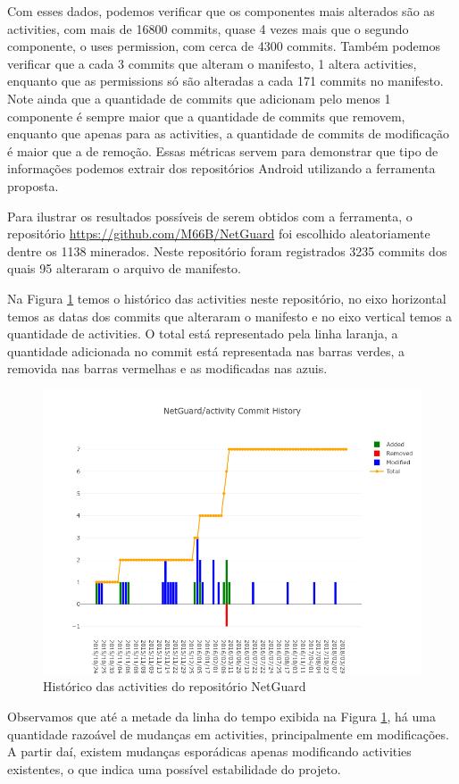 \documentclass[a4paper,12pt]{article}
\begin{document}
{Com esses dados, podemos verificar que os componentes mais alterados são as activities, com mais de 16800 commits, quase 4 vezes mais que o segundo componente, o uses permission, com cerca de 4300 commits. Também podemos verificar que a cada 3 commits que alteram o manifesto, 1 altera activities, enquanto que as permissions só são alteradas a cada 171 commits no manifesto. Note ainda que a quantidade de commits que adicionam pelo menos 1 componente é sempre maior que a quantidade de commits que removem, enquanto que apenas para as activities, a quantidade de commits de modificação é maior que a de remoção. Essas métricas servem para demonstrar que tipo de informações podemos extrair dos repositórios Android utilizando a ferramenta proposta. 

\sloppy
Para ilustrar os resultados possíveis de serem obtidos com a ferramenta, o repositório {\fontsize{10pt}{12pt}\url{https://github.com/M66B/NetGuard}} foi escolhido aleatoriamente dentre os 1138 minerados. Neste repositório foram registrados 3235 commits dos quais 95 alteraram o arquivo de manifesto.

Na Figura \ref{fig:repoactivity} temos o histórico das activities neste repositório, no eixo horizontal temos as datas dos commits que alteraram o manifesto e no eixo vertical temos a quantidade de activities. O total está representado pela linha laranja, a quantidade adicionada no commit está representada nas barras verdes, a removida nas barras vermelhas e as modificadas nas azuis. 

\begin{figure}[H]
\centering
\includegraphics[width=\linewidth,height=0.5\linewidth]{imgs/NetGuard_activity_history.png}
\caption{Histórico das activities do repositório NetGuard}
\label{fig:repoactivity}
\end{figure}

Observamos que até a metade da linha do tempo exibida na Figura \ref{fig:repoactivity}, há uma quantidade razoável de mudanças em activities, principalmente em modificações. A partir daí, existem mudanças esporádicas apenas modificando activities existentes, o que indica uma possível estabilidade do projeto.

}
\end{document}
